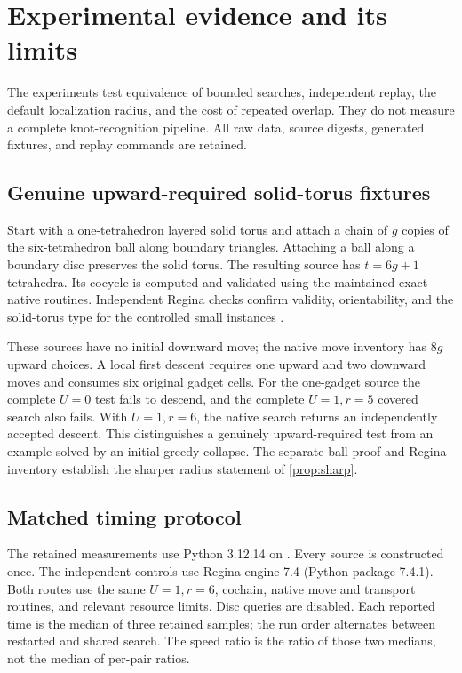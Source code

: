 \section{Experimental evidence and its limits}\label{sec:experiments}

The experiments test equivalence of bounded searches, independent replay,
the default localization radius, and the cost of repeated overlap. They
do not measure a complete knot-recognition pipeline. All raw data, source
digests, generated fixtures, and replay commands are retained.

\subsection{Genuine upward-required solid-torus fixtures}

Start with a one-tetrahedron layered solid torus and attach a chain of $g$
copies of the six-tetrahedron ball along boundary triangles. Attaching a
ball along a boundary disc preserves the solid torus. The resulting source
has $t=6g+1$ tetrahedra. Its cocycle is computed and validated using the
maintained exact native routines. Independent Regina checks confirm validity,
orientability, and the solid-torus type for the controlled small instances
\cite{regina}.

These sources have no initial downward move; the native move inventory has
$8g$ upward choices. A local first descent requires one upward and two
downward moves and consumes six original gadget cells. For the one-gadget
source the complete $U=0$ test fails to descend, and the complete
$U=1,r=5$ covered search also fails. With $U=1,r=6$, the native search
returns an independently accepted descent. This distinguishes a genuinely
upward-required test from an example solved by an initial greedy collapse.
The separate ball proof and Regina inventory establish the sharper
radius statement of \cref{prop:sharp}.

\subsection{Matched timing protocol}

The retained measurements use Python 3.12.14 on
. Every source is constructed once.
The independent controls use Regina engine 7.4 (Python package 7.4.1).
Both routes use the same $U=1,r=6$, cochain, native move and transport
routines, and relevant resource limits. Disc queries are disabled.
Each reported time is the median of three retained samples; the run order
alternates between restarted and shared search. The speed ratio is the
ratio of those two medians, not the median of per-pair ratios.

